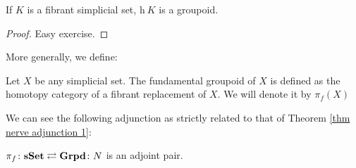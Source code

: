 \begin{refsection}
\begin{lemma}
If $K$ is a fibrant simplicial set, $\mathrm h \: K$ is a groupoid.
\end{lemma}

\begin{proof}
Easy exercise.
\end{proof}

More generally, we define:

\begin{defin}
Let $X$ be any simplicial set. The fundamental groupoid of $X$ is defined as the homotopy category of a fibrant replacement of $X$. We will denote it by $\pi_{f}(X)$
\end{defin}

We can see the following adjunction as strictly related to that of Theorem \ref{thm nerve adjunction 1}:

\begin{thm} \label{thm nerve adjunction 2}
$\pi_f \colon \mathbf{sSet} \rightleftarrows \mathbf{Grpd} \colon N$ is an adjoint pair.
\end{thm}

\printbibliography[heading = local]

\end{refsection}
